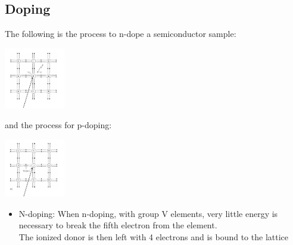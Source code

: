 \documentclass[nobib]{tufte-handout}
\begin{document}
\subsection{Doping}
The following is the process to n-dope a semiconductor sample:
\begin{center}
    \includegraphics*[width = 100px]{images/ndope.png}
\end{center}
and the process for p-doping:
\begin{center}
    \includegraphics*[width = 100px]{images/pdope.png}
\end{center}
\begin{itemize}
    \item N-doping: When n-doping, with group V elements, very little energy is necessary to break the fifth electron from the element.\\
    The ionized donor is then left with 4 electrons and is bound to the lattice
\end{itemize}
\end{document}
